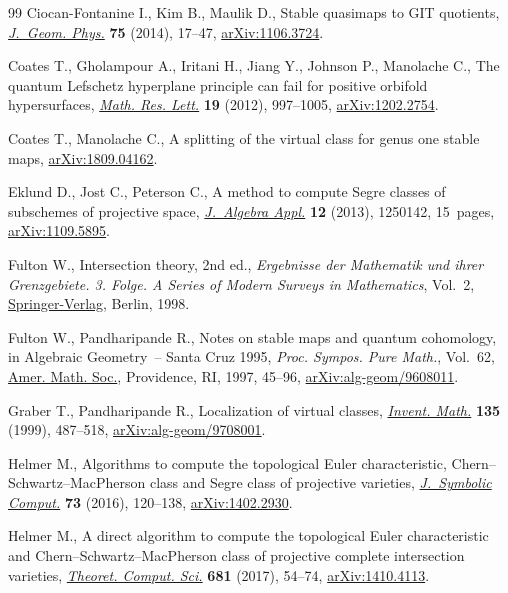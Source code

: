 \documentclass[pdftex]{sigma}
\numberwithin{equation}{section}
\begin{document}
\begin{thebibliography}{99}
Ciocan-Fontanine I., Kim B., Maulik D., Stable quasimaps to {GIT} quotients,
 \href{https://doi.org/10.1016/j.geomphys.2013.08.019}{\textit{J.~Geom. Phys.}} \textbf{75} (2014), 17--47, \href{https://arxiv.org/abs/1106.3724}{arXiv:1106.3724}.

Coates T., Gholampour A., Iritani H., Jiang Y., Johnson P., Manolache C., The
 quantum {L}efschetz hyperplane principle can fail for positive orbifold
 hypersurfaces, \href{https://doi.org/10.4310/MRL.2012.v19.n5.a3}{\textit{Math. Res. Lett.}} \textbf{19} (2012), 997--1005,
 \href{https://arxiv.org/abs/1202.2754}{arXiv:1202.2754}.

Coates T., Manolache C., A splitting of the virtual class for genus one stable
 maps, \href{https://arxiv.org/abs/1809.04162}{arXiv:1809.04162}.

Eklund D., Jost C., Peterson C., A method to compute {S}egre classes of
 subschemes of projective space, \href{https://doi.org/10.1142/S0219498812501423}{\textit{J.~Algebra Appl.}} \textbf{12} (2013),
 1250142, 15~pages, \href{https://arxiv.org/abs/1109.5895}{arXiv:1109.5895}.

Fulton W., Intersection theory, 2nd ed., \textit{Ergebnisse der Mathematik und ihrer
 Grenzgebiete. 3. Folge. A Series of Modern Surveys in Mathematics}, Vol.~2,
 \href{https://doi.org/10.1007/978-1-4612-1700-8}{Springer-Verlag}, Berlin, 1998.

Fulton W., Pandharipande R., Notes on stable maps and quantum cohomology, in
 Algebraic Geometry~-- {S}anta {C}ruz 1995, \textit{Proc. Sympos. Pure Math.},
 Vol.~62, \href{https://doi.org/10.1090/pspum/062.2/1492534}{Amer. Math. Soc.}, Providence, RI, 1997, 45--96,
 \href{https://arxiv.org/abs/alg-geom/9608011}{arXiv:alg-geom/9608011}.

Graber T., Pandharipande R., Localization of virtual classes, \href{https://doi.org/10.1007/s002220050293}{\textit{Invent.
 Math.}} \textbf{135} (1999), 487--518, \href{https://arxiv.org/abs/alg-geom/9708001}{arXiv:alg-geom/9708001}.

Helmer M., Algorithms to compute the topological {E}uler characteristic,
 {C}hern--{S}chwartz--{M}ac{P}herson class and {S}egre class of projective
 varieties, \href{https://doi.org/10.1016/j.jsc.2015.03.007}{\textit{J.~Symbolic Comput.}} \textbf{73} (2016), 120--138,
 \href{https://arxiv.org/abs/1402.2930}{arXiv:1402.2930}.

Helmer M., A direct algorithm to compute the topological {E}uler characteristic
 and {C}hern--{S}chwartz--{M}ac{P}herson class of projective complete
 intersection varieties, \href{https://doi.org/10.1016/j.tcs.2017.03.029}{\textit{Theoret. Comput. Sci.}} \textbf{681} (2017),
 54--74, \href{https://arxiv.org/abs/1410.4113}{arXiv:1410.4113}.


\end{thebibliography}
\end{document}

